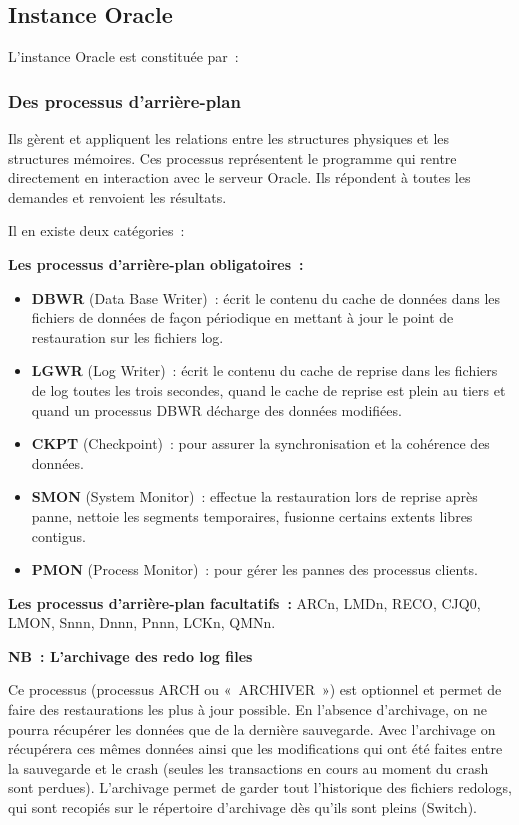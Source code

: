 \documentclass[12pt,a4paper]{report}
\begin{document}
\subsection{Instance Oracle}

L'instance Oracle est constituée par~:

\subsubsection{Des processus d'arrière-plan}

Ils gèrent et appliquent les relations entre les structures physiques et les
structures mémoires. Ces processus représentent le programme qui rentre
directement en interaction avec le serveur Oracle. Ils répondent à toutes les
demandes et renvoient les résultats.

Il en existe deux catégories~:

\medskip
\noindent\textbf{Les processus d'arrière-plan obligatoires~:}

\begin{itemize}[leftmargin=*]
  \item \textbf{DBWR} (Data Base Writer)~: écrit le contenu du cache de données
        dans les fichiers de données de façon périodique en mettant à jour le
        point de restauration sur les fichiers log.
  \item \textbf{LGWR} (Log Writer)~: écrit le contenu du cache de reprise dans
        les fichiers de log toutes les trois secondes, quand le cache de reprise
        est plein au tiers et quand un processus DBWR décharge des données
        modifiées.
  \item \textbf{CKPT} (Checkpoint)~: pour assurer la synchronisation et la
        cohérence des données.
  \item \textbf{SMON} (System Monitor)~: effectue la restauration lors de reprise
        après panne, nettoie les segments temporaires, fusionne certains extents
        libres contigus.
  \item \textbf{PMON} (Process Monitor)~: pour gérer les pannes des processus
        clients.
\end{itemize}

\noindent\textbf{Les processus d'arrière-plan facultatifs~:}
ARCn, LMDn, RECO, CJQ0, LMON, Snnn, Dnnn, Pnnn, LCKn, QMNn.

\medskip
\noindent\textbf{NB~: L'archivage des redo log files}

Ce processus (processus ARCH ou «~ARCHIVER~») est optionnel et permet de faire
des restaurations les plus à jour possible. En l'absence d'archivage, on ne
pourra récupérer les données que de la dernière sauvegarde. Avec l'archivage
on récupérera ces mêmes données ainsi que les modifications qui ont été faites
entre la sauvegarde et le crash (seules les transactions en cours au moment du
crash sont perdues). L'archivage permet de garder tout l'historique des fichiers
redologs, qui sont recopiés sur le répertoire d'archivage dès qu'ils sont pleins
(Switch).
\end{document}
